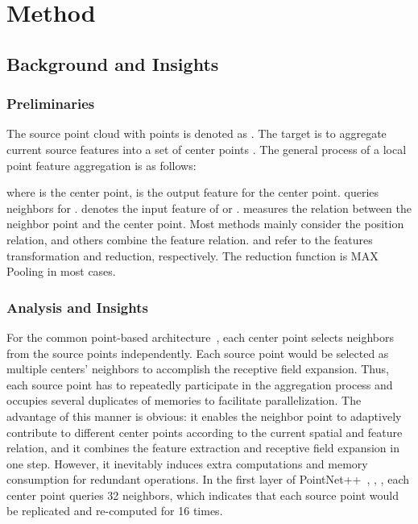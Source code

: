 \documentclass[journal]{IEEEtran}
\begin{document}
\section{Method}

\subsection{Background and Insights}
\label{sec:analysis}

\subsubsection{Preliminaries} The source point cloud with  points is denoted as . The target is to aggregate current source features into a set of center points . The general process of a local point feature aggregation is as follows:




\noindent
where  is the center point,  is the output feature for the center point.  queries neighbors for .  denotes the input feature of  or .  measures the relation between the neighbor point and the center point. Most methods mainly consider the position relation, and others combine the feature relation.  and  refer to the features transformation and reduction, respectively. The reduction function is MAX Pooling in most cases. 


\subsubsection{Analysis and Insights} For the common point-based architecture~\cite{PointNet++}, each center point selects neighbors from the source points independently. Each source point would be selected as multiple centers' neighbors to accomplish the receptive field expansion. Thus, each source point has to repeatedly participate in the aggregation process and occupies several duplicates of memories to facilitate parallelization. The advantage of this manner is obvious: it enables the neighbor point to adaptively contribute to different center points according to the current spatial and feature relation, and it combines the feature extraction and receptive field expansion in one step. However, it inevitably induces extra computations and memory consumption for redundant operations. In the first layer of PointNet++~\cite{PointNet++}, , , each center point queries 32 neighbors, which indicates that each source point would be replicated and re-computed for 16 times.
\end{document}
